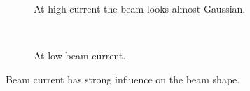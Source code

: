 \begin{figure}[!ht]
  \begin{subfigure}[t]{0.5\textwidth}
    
    \caption{At high current the beam looks almost Gaussian.}
    \label{chap4:ex_beam_profile_a}
  \end{subfigure}
  ~
  \begin{subfigure}[t]{0.5\textwidth}
    
    \caption{At low beam current.}
    \label{chap4:ex_beam_profile_b}
  \end{subfigure}
  \caption[Beam current has strong influence on the beam shape]{Beam current has strong influence on the beam shape.}
  \label{chap4:ex_beam_profile}
\end{figure}
